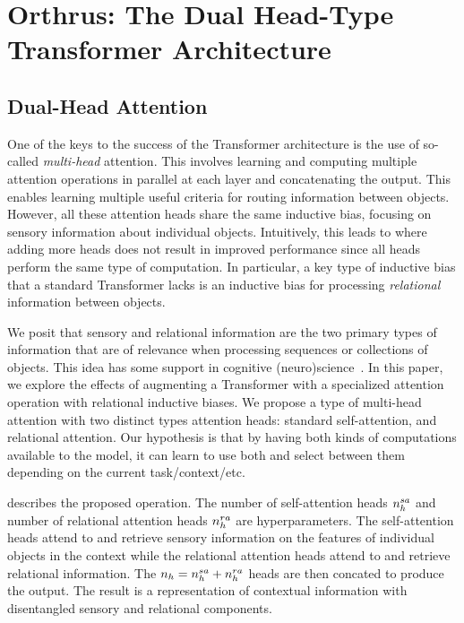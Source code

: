 \section{Orthrus: The Dual Head-Type Transformer Architecture}

\subsection{Dual-Head Attention}

One of the keys to the success of the Transformer architecture is the use of so-called \textit{multi-head} attention. This involves learning and computing multiple attention operations in parallel at each layer and concatenating the output. This enables learning multiple useful criteria for routing information between objects. However, all these attention heads share the same inductive bias, focusing on sensory information about individual objects. Intuitively, this leads to  where adding more heads does not result in improved performance since all heads perform the same type of computation. In particular, a key type of inductive bias that a standard Transformer lacks is an inductive bias for processing \textit{relational} information between objects.

We posit that sensory and relational information are the two primary types of information that are of relevance when processing sequences or collections of objects. This idea has some support  in cognitive (neuro)science~\citep{citation}. In this paper, we explore the effects of augmenting a Transformer with a specialized attention operation with relational inductive biases. We propose a type of multi-head attention with two distinct types attention heads: standard self-attention, and relational attention. Our hypothesis is that by having both kinds of computations available to the model, it can learn to use both and select between them depending on the current task/context/etc.

 describes the proposed operation. The number of self-attention heads $n_h^{sa}$ and number of relational attention heads $n_h^{ra}$ are hyperparameters. The self-attention heads attend to and retrieve sensory information on the features of individual objects in the context while the relational attention heads attend to and retrieve relational information. The $n_h = n_h^{sa} + n_h^{ra}$ heads are then concated to produce the output. The result is a representation of contextual information with disentangled sensory and relational components.

